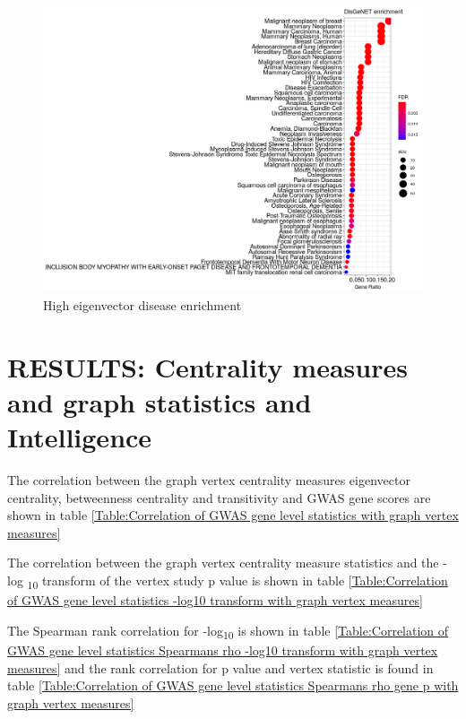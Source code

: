 \begin{figure}
    \centering
    \includegraphics[width=\textwidth]{images/Rplot_high_eigenvector_centrality_disggen0.9].png}
    \caption{High eigenvector disease enrichment}
    \label{fig:high eigenvector disease enrichment cut off 0.05}
\end{figure}


\section{RESULTS: Centrality measures and graph statistics and Intelligence}

The correlation between the graph vertex centrality measures eigenvector centrality, betweenness centrality and transitivity and GWAS gene scores are shown in table \ref{Table:Correlation of GWAS gene level statistics with graph vertex measures}

The correlation between the graph vertex centrality measure statistics and the -log \textsubscript{10} transform of the vertex study p value is shown in table \ref{Table:Correlation of GWAS gene level statistics -log10 transform with graph vertex measures}

The Spearman rank correlation for -log\textsubscript{10} is shown in table \ref{Table:Correlation of GWAS gene level statistics Spearmans rho -log10 transform with graph vertex measures} and the rank correlation for p value and vertex statistic is found in table \ref{Table:Correlation of GWAS gene level statistics Spearmans rho gene p  with graph vertex measures} 

